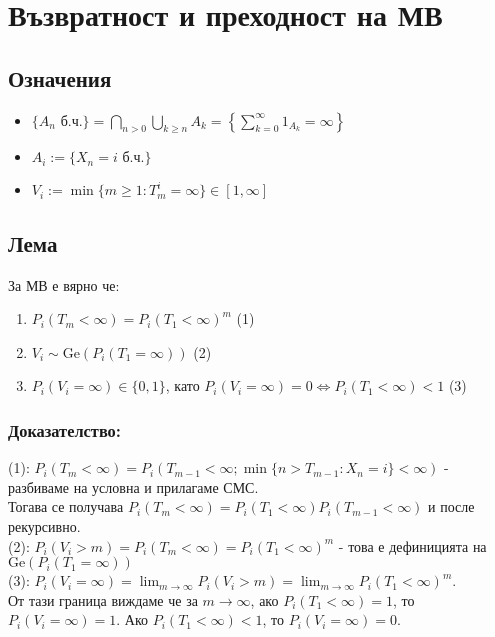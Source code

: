 \documentclass{article}
\begin{document}
\section{Възвратност и преходност на МВ}

\subsection{Означения}
\begin{itemize}
\item $\{A_n \text{ б.ч.}\} = \bigcap_{n>0} \bigcup_{k\geq n} A_k = \left\{\sum_{k=0}^\infty 1_{A_k} = \infty\right\}$
\item $A_i := \{X_n = i \text{ б.ч.}\}$
\item $V_i := \min\{m \geq 1 : T_m^i = \infty\} \in [1,\infty]$
\end{itemize}

\subsection{Лема}
За МВ е вярно че:
\begin{enumerate}
\item $P_i(T_m < \infty) = P_i(T_1 < \infty)^m$ \quad (1)
\item $V_i \sim \mathrm{Ge}(P_i(T_1 = \infty))$ \quad (2)
\item $P_i(V_i = \infty) \in \{0,1\}$, като $P_i(V_i = \infty) = 0 \Leftrightarrow P_i(T_1 < \infty) < 1$ \quad (3)
\end{enumerate}

\subsubsection*{Доказателство:}
(1): $P_i(T_m < \infty) = P_i(T_{m-1} < \infty; \min\{n > T_{m-1} : X_n = i\} < \infty)$ - разбиваме на условна и прилагаме СМС. \\
Тогава се получава $P_i(T_m < \infty) = P_i(T_1 < \infty)P_i(T_{m-1} < \infty)$ и после рекурсивно. \\

(2): $P_i(V_i > m) = P_i(T_m < \infty) = P_i(T_1 < \infty)^m$ - това е дефиницията на $\mathrm{Ge}(P_i(T_1 = \infty))$ \\

(3): $P_i(V_i = \infty) = \lim_{m \to \infty} P_i(V_i > m) = \lim_{m \to \infty} P_i(T_1 < \infty)^m$. \\
От тази граница виждаме че за $m \to \infty$, ако $P_i(T_1 < \infty) = 1$, то $P_i(V_i = \infty) = 1$. Ако $P_i(T_1 < \infty) < 1$, то $P_i(V_i = \infty) = 0$.
\end{document}
